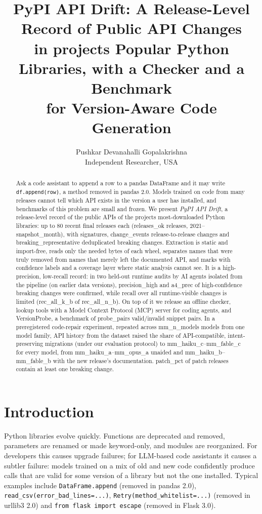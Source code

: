 \documentclass[10pt,twocolumn,letterpaper]{article}
\title{\Large\bfseries PyPI API Drift: A Release-Level Record of Public API Changes\\in {{projects}} Popular Python Libraries, with a Checker and a Benchmark\\for Version-Aware Code Generation}
\author{Pushkar Devanahalli Gopalakrishna\\Independent Researcher, USA}
\date{}
\begin{document}
\maketitle

\begin{abstract}
Ask a code assistant to append a row to a pandas DataFrame and it may write \texttt{df.append(row)}, a method removed
in pandas 2.0. Models trained on code from many releases cannot tell which API exists in the version a user has
installed, and benchmarks of this problem are small and frozen. We present \emph{PyPI API Drift}, a release-level
record of the public APIs of the {{projects}} most-downloaded Python libraries: up to 80 recent final releases each
({{releases_ok}} releases, 2021--{{snapshot_month}}), with signatures, {{change_events}} release-to-release changes and
{{breaking_representative}} deduplicated breaking changes. Extraction is static and import-free, reads only the
needed bytes of each wheel, separates names that were truly removed from names that merely left the documented API,
and marks with confidence labels and a coverage layer where static analysis cannot see. It is a high-precision,
low-recall record: in two held-out runtime audits by AI agents isolated from the pipeline (on earlier data versions),
{{precision_high}} and {{a4_prec}} of high-confidence breaking changes were confirmed, while recall over all runtime-visible changes is limited ({{rec_all_k_b}} of
{{rec_all_n_b}}). On top of it we release an offline checker, lookup tools with a Model Context Protocol (MCP) server for coding agents, and
VersionProbe, a benchmark of {{probe_pairs}} valid/invalid snippet pairs. In a preregistered code-repair experiment,
repeated across {{mm_n_models}} models from one model family, API history from the dataset raised the share of API-compatible,
intent-preserving migrations (under our evaluation protocol) to {{mm_haiku_c}}--{{mm_fable_c}} for every model, from
{{mm_haiku_a}}--{{mm_opus_a}} unaided and {{mm_haiku_b}}--{{mm_fable_b}} with the new release's documentation.
{{patch_pct}} of patch releases contain at least one breaking change.
\end{abstract}

\section{Introduction}
Python libraries evolve quickly. Functions are deprecated and removed, parameters are renamed or made
keyword-only, and modules are reorganized. For developers this causes upgrade failures; for LLM-based code
assistants it causes a subtler failure: models trained on a mix of old and new code confidently produce calls that
are valid for some version of a library but not the one installed. Typical examples include
\texttt{DataFrame.append} (removed in pandas 2.0), \texttt{read\_csv(error\_bad\_lines=...)},
\texttt{Retry(method\_whitelist=...)} (removed in urllib3 2.0) and \texttt{from flask import escape} (removed in
Flask 3.0).
\end{document}
